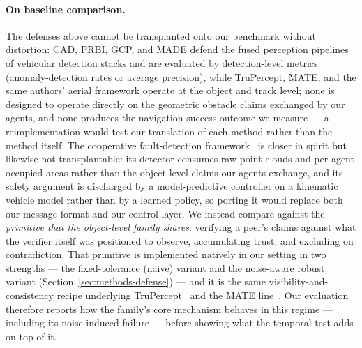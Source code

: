 \paragraph{On baseline comparison.}
The defenses above cannot be transplanted onto our benchmark without
distortion: CAD, PRBI, GCP, and MADE defend the fused perception pipelines
of vehicular detection stacks and are evaluated by detection-level metrics
(anomaly-detection rates or average precision), while TruPercept, MATE, and
the same authors' aerial framework operate at the object and track level;
none is designed to operate directly on the geometric obstacle claims
exchanged by our agents, and none produces the navigation-success outcome
we measure --- a reimplementation would test our translation of each method
rather than the method itself. The cooperative fault-detection
framework~\cite{lidarspoof2023} is closer in spirit but likewise not
transplantable: its detector consumes raw point clouds and per-agent
occupied areas rather than the object-level claims our agents exchange, and
its safety argument is discharged by a model-predictive controller on a
kinematic vehicle model rather than by a learned policy, so porting it would
replace both our message format and our control layer. We
instead compare against the \emph{primitive that the object-level family
shares}: verifying a peer's claims against what the verifier itself was
positioned to observe, accumulating trust, and excluding on contradiction.
That primitive is implemented natively in our setting in two strengths ---
the fixed-tolerance (naive) variant and the noise-aware robust variant
(Section~\ref{sec:methods-defense}) --- and it is the same
visibility-and-consistency recipe underlying
TruPercept~\cite{trupercept2020} and the MATE
line~\cite{mate2025,aerialtrust2025}. Our evaluation therefore reports how
the family's core mechanism behaves in this regime --- including its
noise-induced failure --- before showing what the temporal test adds on top
of it.
